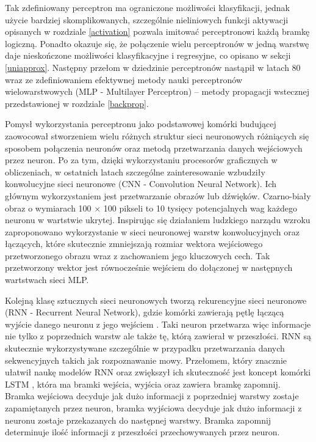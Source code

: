 \documentclass[11pt]{book}
\theoremstyle{definition}
\begin{document}
Tak zdefiniowany perceptron ma ograniczone możliwości klasyfikacji, jednak użycie bardziej skomplikowanych, szczególnie nieliniowych funkcji aktywacji opisanych w rozdziale \ref{activation} pozwala imitować perceptronowi każdą bramkę logiczną. Ponadto okazuje się, że połączenie wielu perceptronów w jedną warstwę daje nieskończone możliwości klasyfikacyjne i regresyjne, co opisano w sekcji \ref{uniapprox}. Następny przełom w dziedzinie perceptronów nastąpił  w latach 80 wraz ze zdefiniowaniem efektywnej metody nauki perceptronów wielowarstwowych (MLP - Multilayer Perceptron) -- metody propagacji wstecznej przedstawionej w rozdziale \ref{backprop}. 

Pomysł wykorzystania perceptronu jako podstawowej komórki budującej zaowocował stworzeniem wielu różnych struktur sieci neuronowych różniących się sposobem połączenia neuronów oraz metodą przetwarzania danych wejściowych przez neuron. Po za tym, dzięki wykorzystaniu procesorów graficznych w obliczeniach, w ostatnich latach szczególne zainteresowanie wzbudziły konwolucyjne sieci neuronowe (CNN - Convolution Neural Network). Ich głównym wykorzystaniem jest przetwarzanie obrazów lub dźwięków. Czarno-biały obraz o wymiarach 100 $\times$ 100 pikseli to 10 tysięcy potencjalnych wag każdego neuronu w wartstwie ukrytej. Inspirując się działaniem ludzkiego narządu wzroku zaproponowano \cite{Lecun98gradient-basedlearning} wykorzystanie w sieci neuronowej warstw konwolucyjnych oraz łączących, które skutecznie zmniejszają rozmiar wektora wejściowego przetworzonego obrazu wraz z zachowaniem jego kluczowych cech. Tak przetworzony wektor jest równocześnie wejściem do dołączonej w następnych wartstwach sieci MLP. 

Kolejną klasę sztucznych sieci neuronowych tworzą rekurencyjne sieci neuronowe (RNN - Recurrent Neural Network), gdzie komórki zawierają pętlę łączącą wyjście danego neuronu z jego wejściem \cite{1990RNN}. Taki neuron przetwarza więc informacje nie tylko z poprzednich warstw ale także tę, którą zawierał w przeszłości. RNN są skutecznie wykorzystywane szczególnie w przypadku przetwarzania danych sekwencyjnych takich jak rozpoznawanie mowy. Przełomem, który znacznie ułatwił naukę modelów RNN oraz zwiększył ich skuteczność jest koncept komórki LSTM \cite{hochreiter1997long}, która ma bramki wejścia, wyjścia oraz zawiera bramkę zapomnij. Bramka wejściowa decyduje jak dużo informacji z poprzedniej warstwy zostaje zapamiętanych przez neuron, bramka wyjściowa decyduje jak dużo informacji z neuronu zostaje przekazanych do następnej warstwy. Bramka zapomnij determinuje ilość informacji z przeszłości przechowywanych przez neuron.
\end{document}

